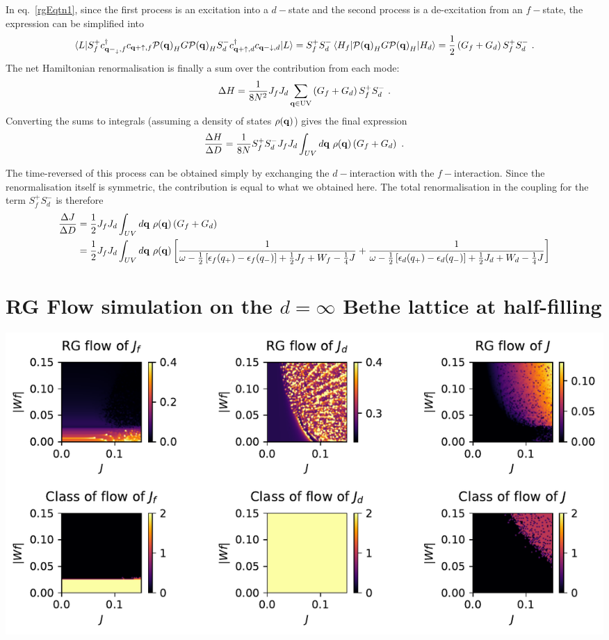 \documentclass[%
reprint,
superscriptaddress,
groupedaddress,
superscriptaddress,
onecolumn,
10pt
]{revtex4-2}
\begin{document}
In eq.~\ref{rgEqtn1}, since the first process is an excitation into a \(d-\)state and the second process is a de-excitation from an \(f-\)state, the expression can be simplified into
\begin{equation}\begin{aligned}\label{rgEqtn2}
	\braket{L | S_f^+ c^\dagger_{{\bf q-}_\downarrow,f}c_{{\bf q+}\uparrow,f} \mathcal{P({\bf q})}_H G \mathcal{P({\bf q})}_H S_d^- c^\dagger_{{\bf q+}\uparrow,d}c_{{\bf q-}\downarrow,d} | L } = S_f^+ S_d^- \braket{H_f | \mathcal{P({\bf q})}_H G \mathcal{P({\bf q})}_H | H_d} = \frac{1}{2}\left(G_f + G_d\right) S_f^+ S_d^-~.
\end{aligned}\end{equation}
The net Hamiltonian renormalisation is finally a sum over the contribution from each mode:
\begin{equation}\begin{aligned}
	\Delta H = \frac{1}{8N^2}J_f J_d \sum_{{\bf q} \in \text{UV}}\left(G_f + G_d\right) S_f^+ S_d^-~.
\end{aligned}\end{equation}
Converting the sums to integrals (assuming a density of states \(\rho({\bf q})\)) gives the final expression
\begin{equation}\begin{aligned}
	\frac{\Delta H}{\Delta D} = \frac{1}{8N} S_f^+ S_d^-J_f J_d \int_{UV} d{\bf q} ~\rho({\bf q}) \left(G_f + G_d\right)~.
\end{aligned}\end{equation}

The time-reversed of this process can be obtained simply by exchanging the \(d-\)interaction with the \(f-\)interaction. Since the renormalisation itself is symmetric, the contribution is equal to what we obtained here. The total renormalisation in the coupling for the term \(S_f^+ S_d^-\) is therefore
\begin{equation}\begin{aligned}
	\frac{\Delta J}{\Delta D} &= \frac{1}{2}J_f J_d \int_{UV} d{\bf q} ~\rho({\bf q}) \left(G_f + G_d\right) \\
							  &= \frac{1}{2}J_f J_d \int_{UV} d{\bf q} ~\rho({\bf q}) \left[\frac{1}{\omega - \frac{1}{2}\left[\epsilon_f(q_+) - \epsilon_f(q_-)\right] + \frac{1}{2}J_f + W_f - \frac{1}{4}J} + \frac{1}{\omega - \frac{1}{2}\left[\epsilon_d(q_+) - \epsilon_d(q_-)\right] + \frac{1}{2}J_d + W_d - \frac{1}{4}J}\right]
\end{aligned}\end{equation}

\section{RG Flow simulation on the \(d=\infty\) Bethe lattice at half-filling}
\includegraphics[width=\textwidth]{bilayerHubbard.pdf}
\end{document}
